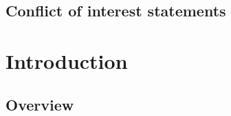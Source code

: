 \documentclass[
	10pt, %
	fleqn, %
	a5paper, %
]{LegrandOrangeBook}
\begin{document}

\chapterspaceabove{6.75cm} %
\chapterspacebelow{7.25cm} %


\section{Conflict of interest statements}

\chapter{Introduction}
\section{Overview}

\end{document}
